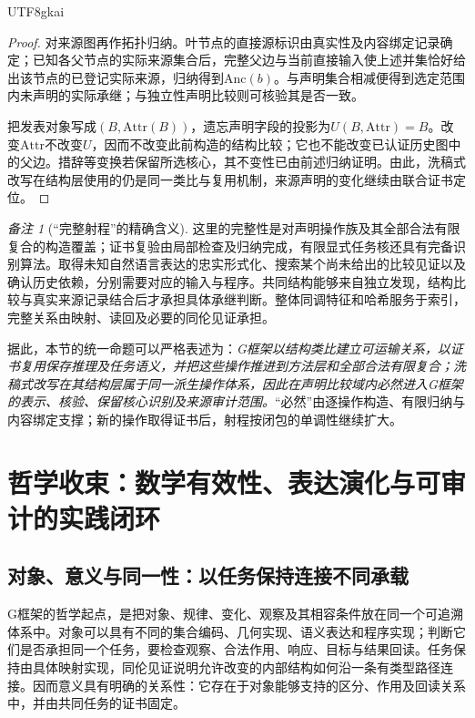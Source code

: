 \documentclass[11pt,a4paper]{article}
\theoremstyle{plain}
\theoremstyle{definition}
\theoremstyle{remark}
\newtheorem{remark}[theorem]{备注}
\begin{document}
\begin{CJK*}{UTF8}{gkai}
\begin{proof}
对来源图再作拓扑归纳。叶节点的直接源标识由真实性及内容绑定记录确定；已知各父节点的实际来源集合后，完整父边与当前直接输入使上述并集恰好给出该节点的已登记实际来源，归纳得到$\mathrm{Anc}(b)$。与声明集合相减便得到选定范围内未声明的实际承继；与独立性声明比较则可核验其是否一致。

把发表对象写成$(B,\mathrm{Attr}(B))$，遗忘声明字段的投影为$U(B,\mathrm{Attr})=B$。改变$\mathrm{Attr}$不改变$U$，因而不改变此前构造的结构比较；它也不能改变已认证历史图中的父边。措辞等变换若保留所选核心，其不变性已由前述归纳证明。由此，洗稿式改写在结构层使用的仍是同一类比与复用机制，来源声明的变化继续由联合证书定位。
\end{proof}

\begin{remark}[“完整射程”的精确含义]
这里的完整性是对声明操作族及其全部合法有限复合的构造覆盖；证书复验由局部检查及归纳完成，有限显式任务核还具有完备识别算法。取得未知自然语言表达的忠实形式化、搜索某个尚未给出的比较见证以及确认历史依赖，分别需要对应的输入与程序。共同结构能够来自独立发现，结构比较与真实来源记录结合后才承担具体承继判断。整体同调特征和哈希服务于索引，完整关系由映射、读回及必要的同伦见证承担。
\end{remark}

据此，本节的统一命题可以严格表述为：\emph{G框架以结构类比建立可运输关系，以证书复用保存推理及任务语义，并把这些操作推进到方法层和全部合法有限复合；洗稿式改写在其结构层属于同一派生操作体系，因此在声明比较域内必然进入G框架的表示、核验、保留核心识别及来源审计范围。}“必然”由逐操作构造、有限归纳与内容绑定支撑；新的操作取得证书后，射程按闭包的单调性继续扩大。



\section{哲学收束：数学有效性、表达演化与可审计的实践闭环}
\label{pc:philosophy}

\subsection{对象、意义与同一性：以任务保持连接不同承载}

G框架的哲学起点，是把对象、规律、变化、观察及其相容条件放在同一个可追溯体系中。对象可以具有不同的集合编码、几何实现、语义表达和程序实现；判断它们是否承担同一个任务，要检查观察、合法作用、响应、目标与结果回读。任务保持由具体映射实现，同伦见证说明允许改变的内部结构如何沿一条有类型路径连接。因而意义具有明确的关系性：它存在于对象能够支持的区分、作用及回读关系中，并由共同任务的证书固定。


\end{CJK*}
\end{document}
